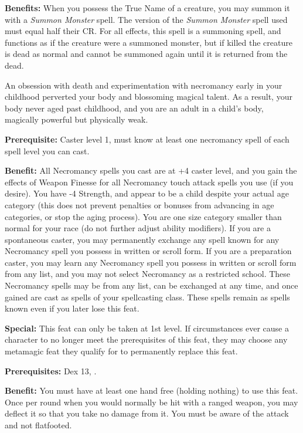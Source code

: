 \textbf{Benefits:} When you possess the True Name of a creature, you may summon it with a \textit{Summon Monster} spell. The version of the \textit{Summon Monster} spell used must equal half their CR. For all effects, this spell is a summoning spell, and functions as if the creature were a summoned monster, but if killed the creature is dead as normal and cannot be summoned again until it is returned from the dead.


An obsession with death and experimentation with necromancy early in your childhood perverted your body and blossoming magical talent. As a result, your body never aged past childhood, and you are an adult in a child's body, magically powerful but physically weak.

\textbf{Prerequisite:} Caster level 1, must know at least one necromancy spell of each spell level you can cast.

\textbf{Benefit:} All Necromancy spells you cast are at +4 caster level, and you gain the effects of Weapon Finesse for all Necromancy touch attack spells you use (if you desire). You have -4 Strength, and appear to be a child despite your actual age category (this does not prevent penalties or bonuses from advancing in age categories, or stop the aging process). You are one size category smaller than normal for your race (do not further adjust ability modifiers). If you are a spontaneous caster, you may permanently exchange any spell known for any Necromancy spell you possess in written or scroll form. If you are a preparation caster, you may learn any Necromancy spell you possess in written or scroll form from any list, and you may not select Necromancy as a restricted school. These Necromancy spells may be from any list, can be exchanged at any time, and once gained are cast as spells of your spellcasting class. These spells remain as spells known even if you later lose this feat.

\textbf{Special:} This feat can only be taken at 1st level. If circumstances ever cause a character to no longer meet the prerequisites of this feat, they may choose any metamagic feat they qualify for to permanently replace this feat.


\textbf{Prerequisites:} Dex 13, .

\textbf{Benefit:} You must have at least one hand free (holding nothing) to use this feat. Once per round when you would normally be hit with a ranged weapon, you may deflect it so that you take no damage from it. You must be aware of the attack and not flatfooted.

